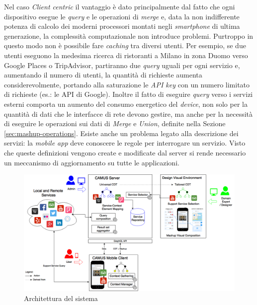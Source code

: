 Nel caso \emph{Client centric} il vantaggio è dato principalmente dal fatto che ogni dispositivo esegue le \emph{query} e le operazioni di \emph{merge} e, data la non indifferente potenza di calcolo dei moderni processori montati negli \emph{smartphone} di ultima generazione, la complessità computazionale non introduce problemi.
Purtroppo in questo modo non è possibile fare \emph{caching} tra diversi utenti. Per esempio, se due utenti eseguono la medesima ricerca di ristoranti a Milano in zona Duomo verso Google Places o TripAdvisor, partiranno due \emph{query} uguali per ogni servizio e, aumentando il numero di utenti, la quantità di richieste aumenta considerevolmente, portando alla saturazione le \emph{API key} con un numero limitato di richieste (es.: le API di Google). Inoltre il fatto di eseguire \emph{query} verso i servizi esterni comporta un aumento del consumo energetico del \emph{device}, non solo per la quantità di dati che le interfacce di rete devono gestire, ma anche per la necessità di eseguire le operazioni sui dati di \emph{Merge} e \emph{Union}, definite nella Sezione \ref{sec:mashup-operations}. 
Esiste anche un problema legato alla descrizione dei servizi: la \emph{mobile app} deve conoscere le regole per interrogare un servizio. Visto che queste definizioni vengono create e modificate dal server si rende necessario un meccanismo di aggiornamento su tutte le applicazioni.

\begin{figure}[t]
	\centering
	\includegraphics[width=\textwidth]{3-metodologia-camus/Immagini/architettura-generale.png}
	\caption{Architettura del sistema}\label{fig:architettura-sistema}
\end{figure}

